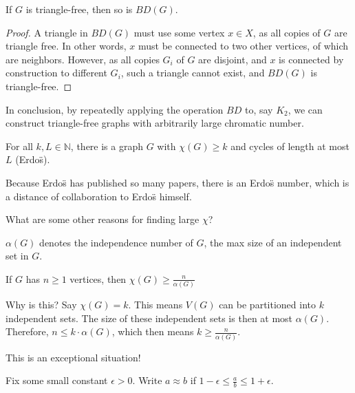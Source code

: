 \documentclass[a4paper]{article}
\begin{document}
\begin{lemma}
	If \( G \) is triangle-free, then so is \( BD(G) \).
\end{lemma}
\begin{proof}
	A triangle in \( BD(G) \) must use some vertex \( x \in X \), as all copies of \( G \) are triangle free. In other words, \( x \) must be connected to two other vertices, of which are neighbors. However, as all copies \( G_i \) of \( G \) are disjoint, and \( x \) is connected by construction to different \( G_i \), such a triangle cannot exist, and \( BD(G) \) is triangle-free.
\end{proof}

In conclusion, by repeatedly applying the operation \( BD \) to, say \( K_2 \), we can construct triangle-free graphs with arbitrarily large chromatic number.

\begin{theorem}
	For all \( k,L \in \mathbb{N}\), there is a graph \( G \) with \( \chi(G) \ge k \) and cycles of length at most \( L \) (Erdo\"s).
\end{theorem}

\begin{note}
	Because Erdo\"s has published so many papers, there is an Erdo\"s number, which is a distance of collaboration to Erdo\"s himself.
\end{note}

What are some other reasons for finding large \( \chi \)?

\begin{definition}
	\( \alpha(G) \) denotes the independence number of \( G \), the max size of an independent set in \( G \).
\end{definition}

\begin{property}
	If \( G \) has \( n \ge 1 \) vertices, then \( \chi (G) \ge \frac{n}{\alpha (G)} \)
\end{property}

Why is this? Say \( \chi(G) = k \). This means \( V(G) \) can be partitioned into \( k \) independent sets. The size of these independent sets is then at most \( \alpha(G) \). Therefore, \( n \le k \cdot \alpha (G) \), which then means \( k \ge  \frac{n}{\alpha (G)} \).

This is an exceptional situation!

\begin{notation}
	Fix some small constant \( \epsilon >0 \). Write \( a \approx b \) if \( 1 - \epsilon  \le  \frac{a}{b} \le  1 + \epsilon  \). 
\end{notation}
\end{document}
